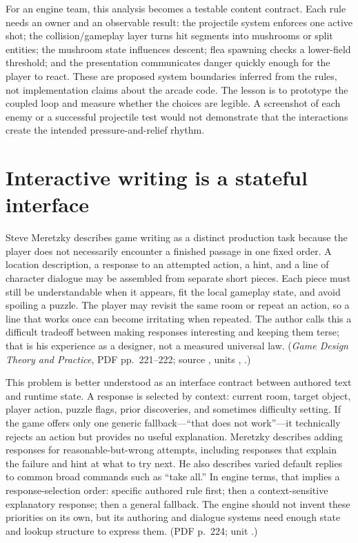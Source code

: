 For an engine team, this analysis becomes a testable content contract. Each rule needs an owner and an observable result: the projectile system enforces one active shot; the collision/gameplay layer turns hit segments into mushrooms or split entities; the mushroom state influences descent; flea spawning checks a lower-field threshold; and the presentation communicates danger quickly enough for the player to react. These are proposed system boundaries inferred from the rules, not implementation claims about the arcade code. The lesson is to prototype the coupled loop and measure whether the choices are legible. A screenshot of each enemy or a successful projectile test would not demonstrate that the interactions create the intended pressure-and-relief rhythm.

\section{Interactive writing is a stateful interface}\label{06-engine-ii-ch046-interactive-writing-is-a-stateful-interface}

\hypertarget{06-engine-ii-ch046-interactive-writing-is-a-stateful-interface}{}

Steve Meretzky describes game writing as a distinct production task because the player does not necessarily encounter a finished passage in one fixed order. A location description, a response to an attempted action, a hint, and a line of character dialogue may be assembled from separate short pieces. Each piece must still be understandable when it appears, fit the local gameplay state, and avoid spoiling a puzzle. The player may revisit the same room or repeat an action, so a line that works once can become irritating when repeated. The author calls this a difficult tradeoff between making responses interesting and keeping them terse; that is his experience as a designer, not a measured universal law. (\emph{Game Design Theory and Practice}, PDF pp.~221--222; source , units , .)

This problem is better understood as an interface contract between authored text and runtime state. A response is selected by context: current room, target object, player action, puzzle flags, prior discoveries, and sometimes difficulty setting. If the game offers only one generic fallback---``that does not work''---it technically rejects an action but provides no useful explanation. Meretzky describes adding responses for reasonable-but-wrong attempts, including responses that explain the failure and hint at what to try next. He also describes varied default replies to common broad commands such as ``take all.'' In engine terms, that implies a response-selection order: specific authored rule first; then a context-sensitive explanatory response; then a general fallback. The engine should not invent these priorities on its own, but its authoring and dialogue systems need enough state and lookup structure to express them. (PDF p.~224; unit .)

